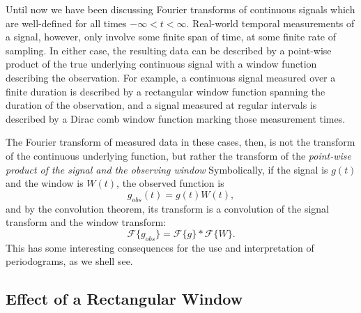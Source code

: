 \documentclass[preprint]{aastex}
\begin{document}
Until now we have been discussing Fourier transforms of continuous signals
which are well-defined for all times $-\infty < t < \infty$.
Real-world temporal measurements of a signal, however, only involve some
finite span of time, at some finite rate of sampling.
In either case, the resulting data can be described by a point-wise product
of the true underlying continuous signal with a window function describing
the observation.
For example, a continuous signal measured over a finite duration is described
by a rectangular window function spanning the duration of the observation,
and a signal measured at regular intervals is described by a Dirac comb window
function marking those measurement times.

The Fourier transform of measured data in these cases, then, is not the
transform of the continuous underlying function, but rather the transform
of the {\it point-wise product of the signal and the observing window}
Symbolically, if the signal is $g(t)$ and the window is $W(t)$, the observed
function is
\begin{equation}
  g_{obs}(t) = g(t)W(t),
\end{equation}
and by the convolution theorem, its transform is a convolution
of the signal transform and the window transform:
\begin{equation}
  \mathcal{F}\{g_{obs}\} = \mathcal{F}\{g\} \ast \mathcal{F}\{W\}.
\end{equation}
This has some interesting consequences for the use and interpretation of
periodograms, as we shell see.

\subsection{Effect of a Rectangular Window}
\end{document}
